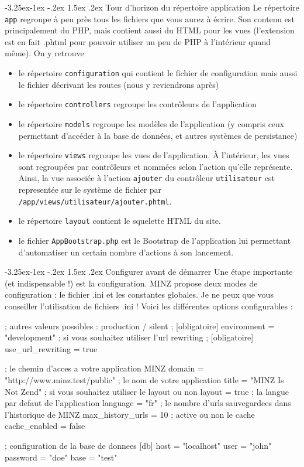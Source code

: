 \documentclass[a4paper,11pt]{article}
\makeatletter
\renewcommand{\subsection}{\@startsection{subsection}{2}{\z@}%
             {-3.25ex\@plus -1ex \@minus -.2ex}%
             {1.5ex \@plus .2ex}%
             {\color{bleuFonce}\normalfont\large\bfseries}}
\makeatother
\begin{document}
\subsection{Tour d'horizon du répertoire application}
Le répertoire \texttt{app} regroupe à peu près tous les fichiers que vous aurez à écrire. Son contenu est principalement du PHP, mais contient aussi du HTML pour les vues (l'extension est en fait .phtml pour pouvoir utiliser un peu de PHP à l'intérieur quand même). On y retrouve
\begin{itemize}
  \item le répertoire \texttt{configuration} qui contient le fichier de configuration mais aussi le fichier décrivant les routes (nous y reviendrons après)
  \item le répertoire \texttt{controllers} regroupe les contrôleurs de l'application
  \item le répertoire \texttt{models} regroupe les modèles de l'application (y compris ceux permettant d'accéder à la base de données, et autres systèmes de persistance)
  \item le répertoire \texttt{views} regroupe les vues de l'application. À l'intérieur, les vues sont regroupées par contrôleurs et nommées selon l'action qu'elle représente. Ainsi, la vue associée à l'action \texttt{ajouter} du contrôleur \texttt{utilisateur} est representée sur le système de fichier par\\\texttt{/app/views/utilisateur/ajouter.phtml}.
  \item le répertoire \texttt{layout} contient le squelette HTML du site.
  \item le fichier \texttt{AppBootstrap.php} est le Bootstrap de l'application lui permettant d'automatiser un certain nombre d'actions à son lancement.
\end{itemize}

\subsection{Configurer avant de démarrer}
Une étape importante (et indispensable !) est la configuration. MINZ propose deux modes de configuration : le fichier .ini et les constantes globales. Je ne peux que vous conseiller l'utilisation de fichiers .ini ! Voici les différentes options configurables :
\begin{ini}
[general]
; autres valeurs possibles : production / silent
; [obligatoire]
environment = "development"
; si vous souhaitez utiliser l'url rewriting
; [obligatoire]
use_url_rewriting = true

; le chemin d'acces a votre application MINZ
domain = "http://www.minz.test/public"
; le nom de votre application
title = "MINZ Is Not Zend"
; si vous souhaitez utiliser le layout ou non
layout = true
; la langue par defaut de l'application
language = "fr"
; le nombre d'urls sauvegardees dans l'historique de MINZ
max_history_urls = 10
; active ou non le cache
cache_enabled = false

; configuration de la base de donnees
[db]
host = "localhost"
user = "john"
password = "doe"
base = "test"
\end{ini}
\end{document}
